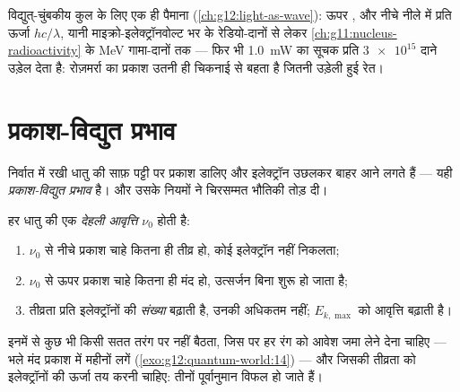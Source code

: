 \begin{omfigure}

{\small विद्युत्-चुंबकीय कुल के लिए एक ही पैमाना (\cref{ch:g12:light-as-wave}): ऊपर
, और नीचे नीले में प्रति  ऊर्जा
$hc/\lambda$, यानी माइक्रो-इलेक्ट्रॉनवोल्ट भर के रेडियो-दानों से लेकर \cref{ch:g11:nucleus-radioactivity} के
\unit{MeV} गामा-दानों तक --- फिर भी \qty{1.0}{mW} का सूचक प्रति  $\num{3e15}$ दाने उड़ेल
देता है: रोज़मर्रा का प्रकाश उतनी ही चिकनाई से बहता है जितनी उड़ेली हुई रेत।}
\end{omfigure}

\section{प्रकाश-विद्युत प्रभाव}

निर्वात में रखी धातु की साफ़ पट्टी पर प्रकाश डालिए और इलेक्ट्रॉन उछलकर बाहर आने
लगते हैं --- यही \emph{प्रकाश-विद्युत प्रभाव} है।
और उसके नियमों ने चिरसम्मत भौतिकी तोड़ दी।

\begin{proposition}[प्रयोग क्या दिखाता है]\label{prop:g12:quantum-world:facts}
हर धातु की एक \emph{देहली आवृत्ति} $\nu_0$ होती है:
\begin{enumerate}
  \item $\nu_0$ से नीचे प्रकाश चाहे कितना ही तीव्र हो, कोई इलेक्ट्रॉन नहीं
        निकलता;
  \item $\nu_0$ से ऊपर प्रकाश चाहे कितना ही मंद हो, उत्सर्जन बिना
         शुरू हो जाता है;
  \item तीव्रता प्रति  इलेक्ट्रॉनों की \emph{संख्या} बढ़ाती है, उनकी
        अधिकतम  नहीं; $E_{k,\max}$ को आवृत्ति बढ़ाती है।
\end{enumerate}
इनमें से कुछ भी किसी सतत तरंग पर नहीं बैठता, जिस पर हर रंग को आवेश
जमा लेने देना चाहिए --- भले मंद प्रकाश में महीनों लगें (\cref{exo:g12:quantum-world:14}) --- और जिसकी
तीव्रता को इलेक्ट्रॉनों की ऊर्जा तय करनी चाहिए: तीनों पूर्वानुमान
विफल हो जाते हैं।
\end{proposition}
\admitted

